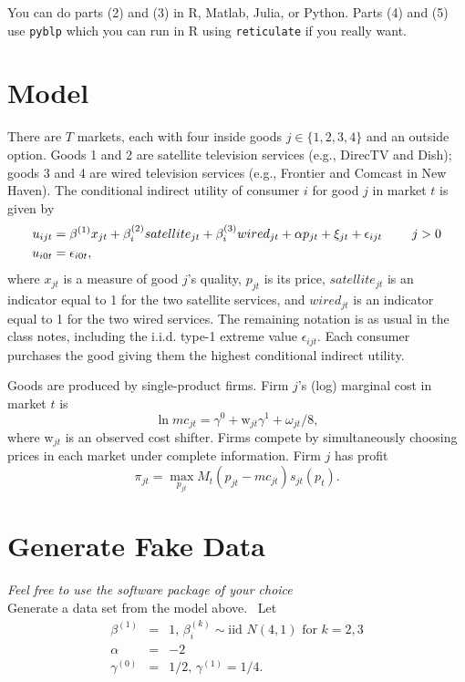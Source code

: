 \documentclass[english,11pt]{article}
\begin{document}
You can do parts (2) and (3) in R, Matlab, Julia, or Python. Parts (4) and (5) use \texttt{pyblp} which you can run in R using \texttt{reticulate} if you really want.
\section{Model}

There are $T$ markets, each with four inside goods $j\in
\{1,2,3,4\}$ and an outside option. Goods 1 and 2 are satellite television
services (e.g., DirecTV and Dish); goods 3 and 4 are wired television
services (e.g., Frontier and Comcast in New Haven).
The conditional indirect utility of consumer $i$ for good $j$ in market $t$
is given by
\begin{align*}
u_{ijt}& =\beta ^{\left( 1\right) }x_{jt}+\beta
_{i}^{(2)}satellite_{jt}+\beta _{i}^{(3)}wired_{jt}+\alpha p_{jt}+\xi
_{jt}+\epsilon _{ijt}\text{ \qquad }j>0 \\
u_{i0t}& =\epsilon _{i0t},
\end{align*}%
where $x_{jt}$ is a measure of good $j$'s quality, $p_{jt}$ is its price, $%
satellite_{jt}$ is an indicator equal to 1 for the two satellite services,
and $wired_{jt}$ is an indicator equal to 1 for the two wired services. The
remaining notation is as usual in the class notes, including the i.i.d.
type-1 extreme value $\epsilon _{ijt}$.  Each consumer purchases the good giving them the highest conditional indirect utility.

Goods are produced by single-product firms. Firm $j$'s (log) marginal
cost in market $t$ is 
\begin{equation*}
\ln mc_{jt}=\gamma ^{0}+\text{w}_{jt}\gamma ^{1}+\omega _{jt}/8,
\end{equation*}%
where w$_{jt}$ is an observed cost shifter. Firms compete by simultaneously choosing prices in each market under complete information. Firm $j$ has profit
\begin{equation*}
\pi _{jt}=\max_{p_{jt}}M_{t}(p_{jt}-mc_{jt})s_{jt}(p_{t}).
\end{equation*}

\section{Generate Fake Data}
\textit{Feel free to use the software package of your choice}\\

Generate a data set from the model above. \ Let%
\begin{eqnarray*}
\beta ^{(1)} &=&1\text{, }\beta _{i}^{\left( k\right) }\sim \text{iid }%
N\left( 4,1\right) \text{ for }k=2,3 \\
\alpha  &=&-2 \\
\gamma ^{(0)} &=&1/2\text{, }\gamma ^{(1)}=1/4.
\end{eqnarray*}
\end{document}
